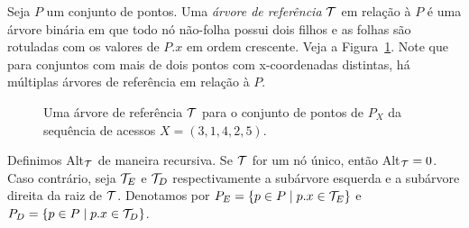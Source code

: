 Seja $P$ um conjunto de pontos. Uma \textit{árvore de referência} $\mathcal{T}$ em relação à $P$ é uma árvore binária em que todo nó não-folha possui dois filhos e as folhas são rotuladas com os valores de $P$\hspace{-0.05cm}$.x$ em ordem crescente. Veja a Figura~\ref{fig:arvore_de_referencia_exemplo_inicial}. Note que para conjuntos com mais de dois pontos com x-coordenadas distintas, há múltiplas árvores de referência em relação à $P$.
\begin{figure}
    \caption{Uma árvore de referência $\mathcal{T}$ para o conjunto de pontos de $P_X$ da sequência de acessos $X = (3,1,4,2,5)$.}
\label{fig:arvore_de_referencia_exemplo_inicial}
\end{figure}

Definimos Alt$_{\mathcal{T}}$ de maneira recursiva. Se $\mathcal{T}$ for um nó único, então Alt$_{\mathcal{T}} = 0$. Caso contrário, seja $\mathcal{T}_{E}$ e $\mathcal{T}_{D}$ respectivamente a subárvore esquerda e a subárvore direita da raiz de $\mathcal{T}$. Denotamos por $P_E = \{p \in P \mid p.x \in \mathcal{T}_E\}$ e $P_D = \{p \in P \mid p.x \in \mathcal{T}_D\}$. 


